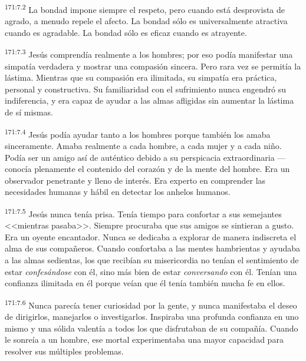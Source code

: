 \par 
\textsuperscript{171:7.2} La bondad impone siempre el respeto, pero cuando está desprovista de agrado, a menudo repele el afecto. La bondad sólo es universalmente atractiva cuando es agradable. La bondad sólo es eficaz cuando es atrayente.

\par 
\textsuperscript{171:7.3} Jesús comprendía realmente a los hombres; por eso podía manifestar una simpatía verdadera y mostrar una compasión sincera. Pero rara vez se permitía la lástima. Mientras que su compasión era ilimitada, su simpatía era práctica, personal y constructiva. Su familiaridad con el sufrimiento nunca engendró su indiferencia, y era capaz de ayudar a las almas afligidas sin aumentar la lástima de sí mismas.

\par 
\textsuperscript{171:7.4} Jesús podía ayudar tanto a los hombres porque también los amaba sinceramente. Amaba realmente a cada hombre, a cada mujer y a cada niño. Podía ser un amigo así de auténtico debido a su perspicacia extraordinaria ---conocía plenamente el contenido del corazón y de la mente del hombre. Era un observador penetrante y lleno de interés. Era experto en comprender las necesidades humanas y hábil en detectar los anhelos humanos.

\par 
\textsuperscript{171:7.5} Jesús nunca tenía prisa. Tenía tiempo para confortar a sus semejantes <<mientras pasaba>>. Siempre procuraba que sus amigos se sintieran a gusto. Era un oyente encantador. Nunca se dedicaba a explorar de manera indiscreta el alma de sus compañeros. Cuando confortaba a las mentes hambrientas y ayudaba a las almas sedientas, los que recibían su misericordia no tenían el sentimiento de estar \textit{confesándose} con él, sino más bien de estar \textit{conversando} con él. Tenían una confianza ilimitada en él porque veían que él tenía también mucha fe en ellos.

\par 
\textsuperscript{171:7.6} Nunca parecía tener curiosidad por la gente, y nunca manifestaba el deseo de dirigirlos, manejarlos o investigarlos. Inspiraba una profunda confianza en uno mismo y una sólida valentía a todos los que disfrutaban de su compañía. Cuando le sonreía a un hombre, ese mortal experimentaba una mayor capacidad para resolver sus múltiples problemas.

